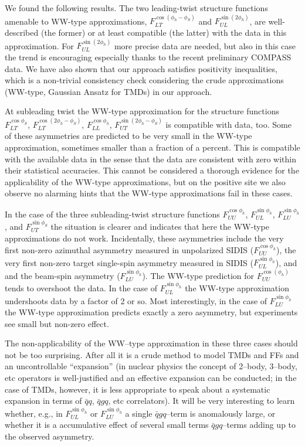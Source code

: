 \documentclass[a4paper,11pt]{article}
\newcommand{\red}[1]{{\color{red} #1}}
\newcommand{\AP}[1]{\red{#1}}
\begin{document}
We found the following results. The two leading-twist 
structure functions amenable to WW-type approximations, 
	$F_{LT}^{\cos(\phi_h -\phi_S)}$ and 
	$F_{UL}^{\sin(2\phi_h)}$, 
are well-described (the former) or at least compatible 
(the latter) with the data in this approximation. For 
$F_{UL}^{\sin(2\phi_h)}$ more precise data are needed, 
but also in this case the trend is encouraging
especially thanks to the recent preliminary COMPASS data.
We have also shown that our approach satisfies positivity
inequalities, which is a non-trivial consistency check 
considering the crude approximations (WW-type, Gaussian 
Ansatz for TMDs) in our approach.

At subleading twist the WW-type approximation for the
structure functions 
	$F_{LT}^{\cos\phi_S}$,
	$F_{LT}^{\cos(2\phi_h-\phi_S)}$,
	$F_{LL}^{\cos\phi_h}$,
	$F_{UT}^{\sin(2\phi_h-\phi_S)}$
is compatible with data, too. Some of these asymmetries are
predicted to be very small in the WW-type approximation,
sometimes smaller than a fraction of a percent. This is
compatible with the available data in the sense that the
data are consistent with zero within their statistical
accuracies. This cannot be considered a thorough evidence
for the applicability of the WW-type approximations, but
on the positive site we also observe no alarming hints
that the WW-type approximations fail in these cases.

In the case of the three subleading-twist structure functions 
	$F_{UU}^{\cos\phi_h}$, 
	$F_{UL}^{\sin\phi_h}$,
	$F_{LU}^{\sin\phi_h}$, and
	$F_{UT}^{\sin\phi_S}$
the situation is clearer and indicates that here the WW-type
approximations do not work.
Incidentally, these asymmetries include the very first non-zero azimuthal 
asymmetry measured in unpolarized SIDIS ($F_{UU}^{\cos\phi_h}$),
the very first non-zero target single-spin asymmetry measured in SIDIS
($F_{UL}^{\sin\phi_h}$), and \AP{and the beam-spin asymmetry } ($F_{LU}^{\sin\phi_h}$).
The WW-type prediction for $F_{UU}^{\cos(\phi_h)}$ tends to overshoot
the data. In the case of $F_{UL}^{\sin\phi_h}$ the WW-type approximation 
undershoots data by a factor of 2 or so.
Most interestingly, in the case of $F_{LU}^{\sin\phi_h}$ the WW-type
approximation predicts exactly a zero asymmetry, but experiments
see small but non-zero effect.

The non-applicability of the WW--type approximation in these three
cases should not be too surprising. After all it is a crude method
to model TMDs and FFs and an uncontrollable ``expansion''
(in nuclear physics the concept of 2--body, 3--body, etc operators
is well-justified and an effective expansion can be conducted; in
the case of TMDs, however, it is less appropriate to speak about a
systematic expansion in terms of $\bar{q}q$, $\bar{q}gq$, etc 
correlators). It will be very interesting to learn whether, e.g., 
in $F_{UL}^{\sin\phi_h}$ or $F_{LU}^{\sin\phi_h}$ a single $\bar{q}gq$--term 
is anomalously large, or whether it is a accumulative effect of 
several small terms $\bar{q}gq$--terms adding up to the observed asymmetry.
\end{document}
